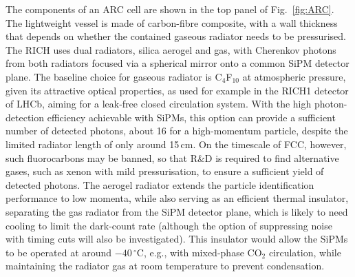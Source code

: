The components of an ARC cell are shown in the top panel of Fig.~\ref{fig:ARC}. 
The lightweight vessel is made of carbon-fibre composite, 
with a wall thickness that depends on whether the contained gaseous radiator needs to be pressurised. 
The RICH uses dual radiators, silica aerogel and gas, 
with Cherenkov photons from both radiators focused via a spherical mirror onto a common SiPM detector plane. 
The baseline choice for gaseous radiator is C$_{4}$F$_{10}$ at atmospheric pressure, 
given its attractive optical properties, as used for example in the RICH1 detector of LHCb, 
aiming for a leak-free closed circulation system. 
With the high photon-detection efficiency achievable with SiPMs, 
this option can provide a sufficient number of detected photons, about 16 for a high-momentum particle, 
despite the limited radiator length of only around 15\,cm. 
On the timescale of FCC, however, such fluorocarbons may be banned, 
so that R\&D is required to find alternative gases, such as xenon with mild pressurisation, 
to ensure a sufficient yield of detected photons. 
The aerogel radiator extends the particle identification performance to low momenta, 
while also serving as an efficient thermal insulator, 
separating the gas radiator from the SiPM detector plane, 
which is likely to need cooling to limit the dark-count rate 
(although the option of suppressing noise with timing cuts will also be investigated). 
This insulator would allow the SiPMs to be operated at around $-40$\,$^\circ$C, 
e.g., with mixed-phase CO$_2$ circulation, 
while maintaining the radiator gas at room temperature to prevent condensation.

